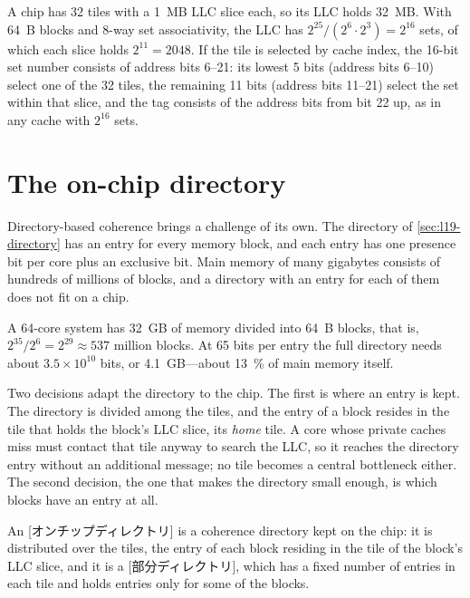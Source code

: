 \documentclass[../main.tex]{subfiles}
\begin{document}
\begin{example}
  \label{ex:l22-llc}
  A chip has 32 tiles with a \SI{1}{MB} LLC slice each, so its LLC holds
  \SI{32}{MB}.  With \SI{64}{B} blocks and 8-way set associativity, the LLC
  has $2^{25}/(2^{6}\cdot 2^{3})=2^{16}$ sets, of which each slice holds
  $2^{11}=2048$.  If the tile is selected by cache index, the 16-bit set
  number consists of address bits 6--21: its lowest 5 bits (address bits
  6--10) select one of the 32 tiles, the remaining 11 bits (address bits
  11--21) select the set within that slice, and the tag consists of the
  address bits from bit 22 up, as in any cache with $2^{16}$ sets.
\end{example}

\section{The on-chip directory}
\label{sec:l22-directory}

Directory-based coherence brings a challenge of its own.  The directory of
\cref{sec:l19-directory} has an entry for every memory block, and each entry
has one presence bit per core plus an exclusive bit.  Main memory of many
gigabytes consists of hundreds of millions of blocks, and a directory with
an entry for each of them does not fit on a chip.

\begin{example}
  \label{ex:l22-directory-size}
  A 64-core system has \SI{32}{GB} of memory divided into \SI{64}{B} blocks,
  that is, $2^{35}/2^{6}=2^{29}\approx 537$ million blocks.  At 65 bits per
  entry the full directory needs about $3.5\times10^{10}$ bits, or
  \SI{4.1}{GB}---about \SI{13}{\percent} of main memory itself.
\end{example}

Two decisions adapt the directory to the chip.  The first is where an entry
is kept.  The directory is divided among the tiles, and the entry of a block
resides in the tile that holds the block's LLC slice, its \emph{home} tile.
A core whose private caches miss must contact that tile anyway to search the
LLC, so it reaches the directory entry without an additional message; no
tile becomes a central bottleneck either.  The second decision, the one that
makes the directory small enough, is which blocks have an entry at all.

\begin{definition}
  An [オンチップディレクトリ] is a coherence
  directory kept on the chip: it is distributed over the tiles, the entry of
  each block residing in the tile of the block's LLC slice, and it is a
  [部分ディレクトリ], which has a fixed number of
  entries in each tile and holds entries only for some of the blocks.
\end{definition}
\end{document}

